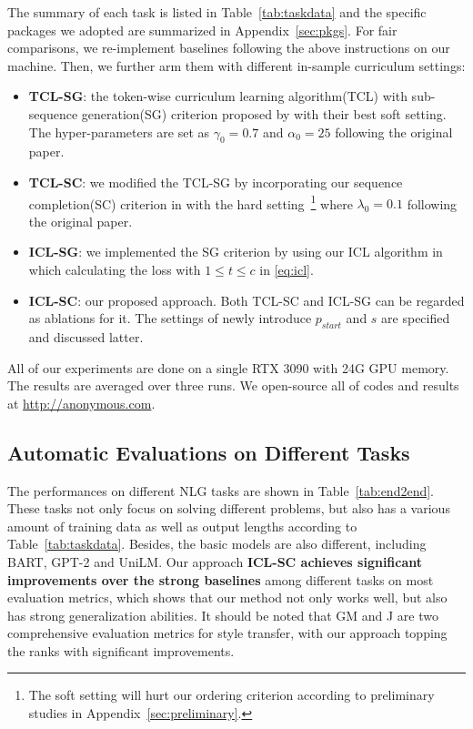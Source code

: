 The summary of each task is listed in Table~\ref{tab:taskdata} and the specific packages we adopted are summarized in Appendix~\ref{sec:pkgs}. 
For fair comparisons, we re-implement baselines following the above instructions on our machine. Then, we further arm them with different in-sample curriculum settings:
\begin{itemize}
	\item \textbf{TCL-SG}: the token-wise curriculum learning algorithm(TCL) with sub-sequence generation(SG) criterion proposed by \citet{liang-etal-2021-token-wise} with their best soft setting. The hyper-parameters are set as $\gamma_0=0.7$ and $\alpha_0=25$ following the original paper.
	\item \textbf{TCL-SC}: we modified the TCL-SG by incorporating our sequence completion(SC) criterion in  with the hard setting~\footnote{The soft setting will hurt our ordering criterion according to preliminary studies in Appendix~\ref{sec:preliminary}.} where $\lambda_0=0.1$ following the original paper.
	\item \textbf{ICL-SG}: we implemented the SG criterion by using our ICL algorithm in  which calculating the loss with $1\leq t \leq c$ in \eqref{eq:icl}.
	\item \textbf{ICL-SC}: our proposed approach. Both TCL-SC and ICL-SG can be regarded as ablations for it. The settings of newly introduce $p_{start}$ and $s$ are specified and discussed latter.
\end{itemize}
All of our experiments are done on a single RTX 3090 with 24G GPU memory. The results are averaged over three runs. We open-source all of codes and results at \url{http://anonymous.com}.


 
\subsection{Automatic Evaluations on Different Tasks}
\label{sec:taskperformances}

The performances on different NLG tasks are shown in Table~\ref{tab:end2end}. 
These tasks not only focus on solving different problems, but also has a various amount of training data as well
as output lengths according to
Table~\ref{tab:taskdata}.
Besides, the basic models are also different, including BART, GPT-2 and UniLM. 
Our approach \textbf{ICL-SC achieves significant improvements over the strong baselines} among different tasks on most evaluation metrics, which shows that our method not only works well, but also has strong generalization abilities.
It should be noted that GM and J are two comprehensive evaluation metrics for style transfer, with our approach topping the ranks with significant improvements.


